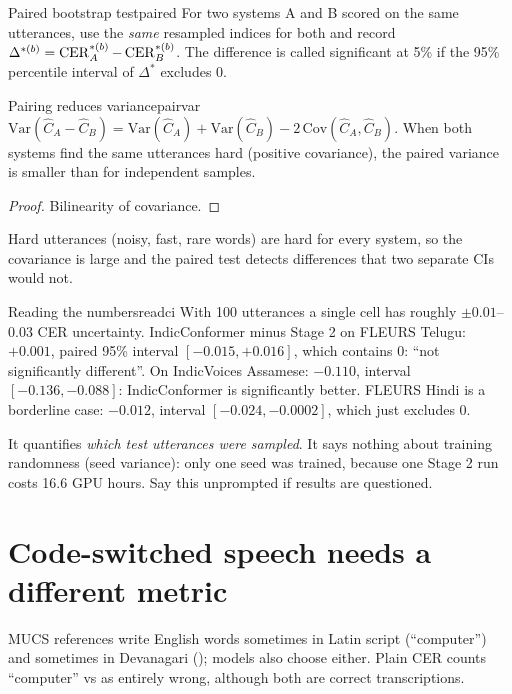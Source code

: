 \begin{definition}{Paired bootstrap test}{paired}
For two systems A and B scored on the same utterances, use the \emph{same} resampled indices for both and record
$\Delta^{*(b)}=\operatorname{CER}_A^{*(b)}-\operatorname{CER}_B^{*(b)}$. The difference is called significant at 5\% if the 95\% percentile interval of
$\Delta^*$ excludes 0.
\end{definition}

\begin{proposition}{Pairing reduces variance}{pairvar}
$\mathrm{Var}(\hat C_A-\hat C_B)=\mathrm{Var}(\hat C_A)+\mathrm{Var}(\hat C_B)-2\,\mathrm{Cov}(\hat C_A,\hat C_B)$. When both systems
find the same utterances hard (positive covariance), the paired variance is smaller than for independent samples.
\end{proposition}
\begin{proof}
Bilinearity of covariance.
\end{proof}

Hard utterances (noisy, fast, rare words) are hard for every system, so the covariance is large and the paired test detects
differences that two separate CIs would not.

\begin{example}{Reading the numbers}{readci}
With 100 utterances a single cell has roughly $\pm0.01$--$0.03$ CER uncertainty. IndicConformer minus Stage 2 on FLEURS Telugu:
$+0.001$, paired 95\% interval $[-0.015,+0.016]$, which contains 0: ``not significantly different''. On IndicVoices Assamese:
$-0.110$, interval $[-0.136,-0.088]$: IndicConformer is significantly better. FLEURS Hindi is a borderline case: $-0.012$,
interval $[-0.024,-0.0002]$, which just excludes 0.
\end{example}

\begin{vivatip}
It quantifies \emph{which test utterances were sampled}. It says nothing about training randomness (seed variance): only one seed was
trained, because one Stage 2 run costs 16.6 GPU hours. Say this unprompted if results are questioned.
\end{vivatip}

\section{Code-switched speech needs a different metric}
\label{sec:csmetric}

MUCS references write English words sometimes in Latin script (``computer'') and sometimes in Devanagari (); models
also choose either. Plain CER counts ``computer'' vs  as entirely wrong, although both are correct transcriptions.

